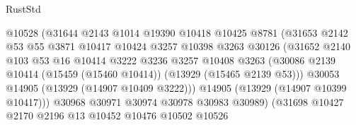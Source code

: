 \begin{lexlean}{RustStd}
\begin{coremodule}
                                    @10528
                                    (@31644
                                      @2143
                                      @1014
                                      @19390
                                      @10418
                                      @10425
                                      @8781
                                      (@31653
                                        @2142
                                        @53
                                        @55
                                        @3871
                                        @10417
                                        @10424
                                        @3257
                                        @10398
                                        @3263
                                        @30126
                                        (@31652
                                          @2140
                                          @103
                                          @53
                                          @16
                                          @10414
                                          @3222
                                          @3236
                                          @3257
                                          @10408
                                          @3263
                                          (@30086
                                            @2139
                                            @10414
                                            (@15459 (@15460 @10414))
                                            (@13929 (@15465 @2139 @53)))
                                          @30053
                                          @14905
                                          (@13929 (@14907 @10409 @3222)))
                                        @14905
                                        (@13929 (@14907 @10399 @10417)))
                                      @30968
                                      @30971
                                      @30974
                                      @30978
                                      @30983
                                      @30989)
                                    (@31698
                                      @10427
                                      @2170
                                      @2196
                                      @13
                                      @10452
                                      @10476
                                      @10502
                                      @10526

\end{coremodule}
\end{lexlean}
